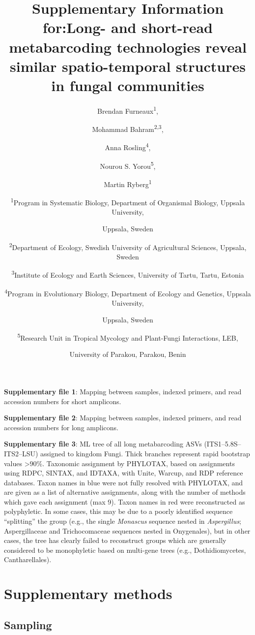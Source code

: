 \documentclass[
]{article}
\title{Supplementary Information for:Long- and short-read metabarcoding technologies reveal similar spatio-temporal structures in fungal communities}
\author{Brendan Furneaux\textsuperscript{1}, \and Mohammad Bahram\textsuperscript{2,3}, \and Anna Rosling\textsuperscript{4}, \and Nourou S. Yorou\textsuperscript{5}, \and Martin Ryberg\textsuperscript{1} \and \textsuperscript{1}Program in Systematic Biology, Department of Organismal Biology, Uppsala University, \and Uppsala, Sweden \and \textsuperscript{2}Department of Ecology, Swedish University of Agricultural Sciences, Uppsala, Sweden \and \textsuperscript{3}Institute of Ecology and Earth Sciences, University of Tartu, Tartu, Estonia \and \textsuperscript{4}Program in Evolutionary Biology, Department of Ecology and Genetics, Uppsala University, \and Uppsala, Sweden \and \textsuperscript{5}Research Unit in Tropical Mycology and Plant-Fungi Interactions, LEB, \and University of Parakou, Parakou, Benin}
\date{}
\begin{document}
\maketitle

\textbf{Supplementary file 1}: Mapping between samples, indexed primers, and read accession numbers for short amplicons.

\textbf{Supplementary file 2}: Mapping between samples, indexed primers, and read accession numbers for long amplicons.

\textbf{Supplementary file 3}: ML tree of all long metabarcoding ASVs (ITS1--5.8S--ITS2--LSU) assigned to kingdom Fungi.
Thick branches represent rapid bootstrap values \textgreater90\%.
Taxonomic assignment by PHYLOTAX, based on assignments using RDPC, SINTAX, and IDTAXA, with Unite, Warcup, and RDP reference databases.
Taxon names in blue were not fully resolved with PHYLOTAX, and are given as a list of alternative assignments, along with the number of methods which gave each assignment (max 9).
Taxon names in red were reconstructed as polyphyletic.
In some cases, this may be due to a poorly identified sequence ``splitting'' the group (e.g., the single \emph{Monascus} sequence nested in \emph{Aspergillus}; Aspergillaceae and Trichocomaceae sequences nested in Onygenales), but in other cases, the tree has clearly failed to reconstruct groups which are generally considered to be monophyletic based on multi-gene trees (e.g., Dothidiomycetes, Cantharellales).

\hypertarget{supplementary-methods}{%
\section{Supplementary methods}\label{supplementary-methods}}

\hypertarget{Sampling-supplement}{%
\subsection{Sampling}\label{Sampling-supplement}}
\end{document}
